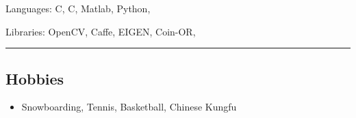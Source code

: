 \documentclass[10pt,letterpaper]{article}
\newenvironment{indentsection}[1]%
{\begin{list}{}%
	{\setlength{\leftmargin}{#1}}%
	\item[]%
}
{\end{list}}
\newcommand{\CPP}
{C\nolinebreak[4]\hspace{-.05em}\raisebox{.22ex}{\footnotesize\bf ++}}
\begin{document}
\begin{indentsection}{\parindent}
\begin{description*}
	\item[Languages:]
	C, \CPP, Matlab, Python, 
	\item[Libraries:]
    OpenCV, Caffe, EIGEN, Coin-OR, 
\end{description*}
\end{indentsection}

\hrule
\vspace{-0.4em}
\subsection*{Hobbies}
\begin{itemize}
\item Snowboarding, Tennis, Basketball, Chinese Kungfu
\end{itemize}
\end{document}
